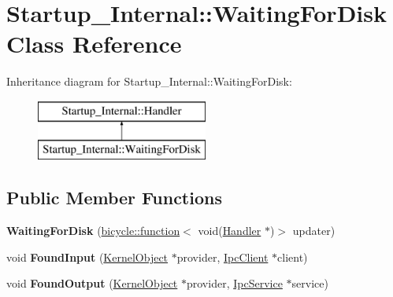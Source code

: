 \hypertarget{class_startup___internal_1_1_waiting_for_disk}{}\section{Startup\+\_\+\+Internal\+:\+:Waiting\+For\+Disk Class Reference}
\label{class_startup___internal_1_1_waiting_for_disk}
Inheritance diagram for Startup\+\_\+\+Internal\+:\+:Waiting\+For\+Disk\+:\begin{figure}[H]
\begin{center}
\leavevmode
\includegraphics[height=2.000000cm]{class_startup___internal_1_1_waiting_for_disk}
\end{center}
\end{figure}
\subsection*{Public Member Functions}
\begin{DoxyCompactItemize}
\item 
\mbox{\label{class_startup___internal_1_1_waiting_for_disk_a6f4ed5282487c6c5182999beb8d1ffb9}} 
{\bfseries Waiting\+For\+Disk} (\hyperlink{classbicycle_1_1function}{bicycle\+::function}$<$ void(\hyperlink{class_startup___internal_1_1_handler}{Handler} $\ast$)$>$ updater)
\item 
\mbox{\label{class_startup___internal_1_1_waiting_for_disk_adbc3351c37612239a5e98632473f2884}} 
void {\bfseries Found\+Input} (\hyperlink{class_kernel_object}{Kernel\+Object} $\ast$provider, \hyperlink{class_ipc_client}{Ipc\+Client} $\ast$client)
\item 
\mbox{\label{class_startup___internal_1_1_waiting_for_disk_ac8453886f1f2bb7956094a82be546bb1}} 
void {\bfseries Found\+Output} (\hyperlink{class_kernel_object}{Kernel\+Object} $\ast$provider, \hyperlink{class_ipc_service}{Ipc\+Service} $\ast$service)
\end{DoxyCompactItemize}
